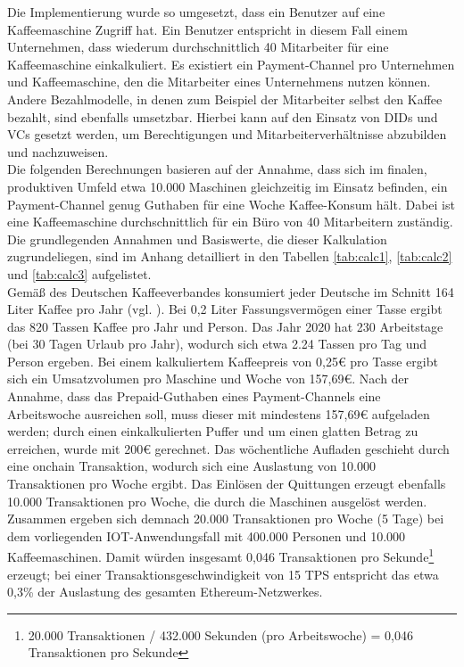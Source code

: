 Die Implementierung wurde so umgesetzt, dass ein Benutzer auf eine Kaffeemaschine Zugriff hat. Ein Benutzer entspricht in diesem Fall einem Unternehmen, dass wiederum durchschnittlich 40 Mitarbeiter für eine Kaffeemaschine einkalkuliert. Es existiert ein Payment-Channel pro Unternehmen und Kaffeemaschine, den die Mitarbeiter eines Unternehmens nutzen können. Andere Bezahlmodelle, in denen zum Beispiel der Mitarbeiter selbst den Kaffee bezahlt, sind ebenfalls umsetzbar. Hierbei kann auf den Einsatz von \ac{DID}s und \ac{VC}s gesetzt werden, um Berechtigungen und Mitarbeiterverhältnisse abzubilden und nachzuweisen.\\

Die folgenden Berechnungen basieren auf der Annahme, dass sich im finalen, produktiven Umfeld etwa 10.000 Maschinen gleichzeitig im Einsatz befinden, ein Payment-Channel genug Guthaben für eine Woche Kaffee-Konsum hält. Dabei ist eine Kaffeemaschine durchschnittlich für ein Büro von 40 Mitarbeitern zuständig. Die grundlegenden Annahmen und Basiswerte, die dieser Kalkulation zugrundeliegen, sind im Anhang detailliert in den Tabellen \ref{tab:calc1}, \ref{tab:calc2} und \ref{tab:calc3} aufgelistet.\\
Gemäß des Deutschen Kaffeeverbandes konsumiert jeder Deutsche im Schnitt 164 Liter Kaffee pro Jahr (vgl. \cite{Kaffee2019}). Bei 0,2 Liter Fassungsvermögen einer Tasse ergibt das 820 Tassen Kaffee pro Jahr und Person. Das Jahr 2020 hat 230 Arbeitstage (bei 30 Tagen Urlaub pro Jahr), wodurch sich etwa 2.24 Tassen pro Tag und Person ergeben. Bei einem kalkuliertem Kaffeepreis von 0,25€ pro Tasse ergibt sich ein Umsatzvolumen pro Maschine und Woche von 157,69€. Nach der Annahme, dass das Prepaid-Guthaben eines Payment-Channels eine Arbeitswoche ausreichen soll, muss dieser mit mindestens 157,69€ aufgeladen werden; durch einen einkalkulierten Puffer und um einen glatten Betrag zu erreichen, wurde mit 200€ gerechnet. Das wöchentliche Aufladen geschieht durch eine onchain Transaktion, wodurch sich eine Auslastung von 10.000 Transaktionen pro Woche ergibt. Das Einlösen der Quittungen erzeugt ebenfalls 10.000 Transaktionen pro Woche, die durch die Maschinen ausgelöst werden. Zusammen ergeben sich demnach 20.000 Transaktionen pro Woche (5 Tage) bei dem vorliegenden IOT-Anwendungsfall mit 400.000 Personen und 10.000 Kaffeemaschinen. Damit würden insgesamt 0,046 Transaktionen pro Sekunde\footnote{20.000 Transaktionen / 432.000 Sekunden (pro Arbeitswoche) = 0,046 Transaktionen pro Sekunde} erzeugt; bei einer Transaktionsgeschwindigkeit von 15 \ac{TPS} entspricht das etwa 0,3\% der Auslastung des gesamten Ethereum-Netzwerkes.\\

